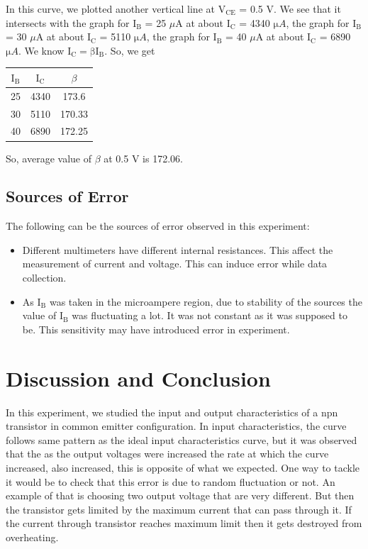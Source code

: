 \documentclass[12pt]{article}
\begin{document}
In this curve, we plotted another vertical line at \( \mathrm{V_{CE}}\) = 0.5 V. We see that it intersects with the graph for \( \mathrm{I_B}\) = 25 \( \mu\)A at about \( \mathrm{I_C}\) = 4340 \( \mathrm{\mu}A\), the graph for \( \mathrm{I_B}\) = 30 \( \mu\)A at about \( \mathrm{I_C}\) = 5110 \( \mathrm{\mu}A\), the graph for \( \mathrm{I_B}\) = 40 \( \mu\)A at about \( \mathrm{I_C}\) = 6890 \( \mathrm{\mu}A\). We know \( \mathrm{I_C = \beta I_B} \). So, we get

\begin{table}[H]
    \centering
    \begin{tabular}{|c|c|c|}
    \hline
        $\mathrm{I_B}$ & $\mathrm{I_C}$ & \( \beta\) \\ \hline \hline
        25 & 4340 & 173.6 \\ \hline
        30 & 5110 & 170.33 \\ \hline
        40 & 6890 & 172.25 \\ \hline
    \end{tabular}
\end{table}
So, average value of \( \beta \) at 0.5 V is 172.06.

\subsection{Sources of Error}
The following can be the sources of error observed in this experiment:
\begin{itemize}
    \item Different multimeters have different internal resistances. This affect the measurement  of current and voltage. This can induce error while data collection.
    \item As \( \mathrm{I_B}\) was taken in the microampere region, due to stability of the sources the value of \( \mathrm{I_B}\) was fluctuating a lot. It was not constant as it was supposed to be. This sensitivity may have introduced error in experiment.
\end{itemize}

\section{Discussion and Conclusion}
In this experiment, we studied the input and output characteristics of a npn transistor in common emitter configuration. In input characteristics, the curve follows same pattern as the ideal input characteristics curve, but it was observed that the as the output voltages were increased the rate at which the curve increased, also increased, this is opposite of what we expected. One way to tackle it would be to check that this error is due to random fluctuation or not. An example of that is choosing two output voltage that are very different. But then the transistor gets limited by the maximum current that can pass through it. If the current through transistor reaches maximum limit then it gets destroyed from overheating.
\end{document}
